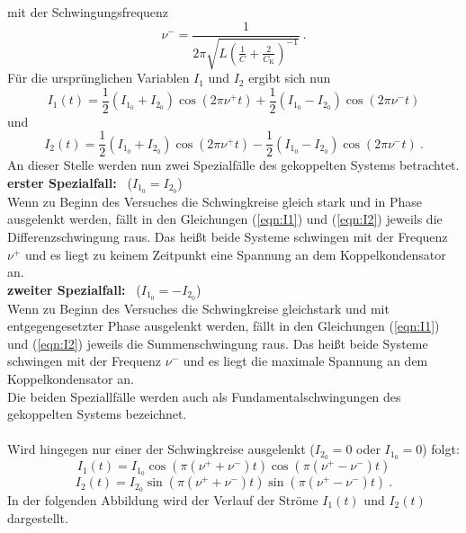 mit der Schwingungsfrequenz
\begin{equation}
\nu^- = \frac{1}{2 \pi \sqrt{L \left(\frac{1}{C} + \frac{2}{C_\text{K}} \right)^{-1}}} \ .
	\label{eqn:vm}
\end{equation}
Für die ursprünglichen Variablen $I_1$ und $I_2$ ergibt sich nun
\begin{equation}
	I_1(t) = \frac{1}{2}(I_{1_0} + I_{2_0}) \cos(2 \pi \nu^+ t) + \frac{1}{2}(I_{1_0} - I_{2_0}) \cos(2 \pi \nu^- t)
	\label{eqn:I1}
\end{equation}
und
\begin{equation}
	I_2(t) = \frac{1}{2}(I_{1_0} + I_{2_0}) \cos(2 \pi \nu^+ t) - \frac{1}{2}(I_{1_0} - I_{2_0}) \cos(2 \pi \nu^- t) \ .
	\label{eqn:I2}
\end{equation}
An dieser Stelle werden nun zwei Spezialfälle des gekoppelten Systems betrachtet. \\
\textbf{erster Spezialfall:} \ ($I_{1_0} = I_{2_0}$) \\
Wenn zu Beginn des Versuches die Schwingkreise gleich stark und in Phase ausgelenkt werden, fällt in den Gleichungen (\ref{eqn:I1}) und (\ref{eqn:I2}) jeweils die Differenzschwingung raus. Das heißt beide Systeme schwingen mit der Frequenz $\nu^+$ und es liegt zu keinem Zeitpunkt eine Spannung an dem Koppelkondensator an. \\
\textbf{zweiter Spezialfall:} \ ($I_{1_0} = -I_{2_0}$) \\
Wenn zu Beginn des Versuches die Schwingkreise gleichstark und mit entgegengesetzter Phase ausgelenkt werden, fällt in den Gleichungen (\ref{eqn:I1}) und (\ref{eqn:I2}) jeweils die Summenschwingung raus. Das heißt beide Systeme schwingen mit der Frequenz $\nu^-$ und es liegt die maximale Spannung an dem Koppelkondensator an. \\
Die beiden Speziallfälle werden auch als Fundamentalschwingungen des gekoppelten Systems bezeichnet.\\
\\
Wird hingegen nur einer der Schwingkreise ausgelenkt ($I_{2_0} = 0$ oder $I_{1_0} = 0$) folgt:
\begin{equation}
	I_1(t) = I_{1_0} \cos(\pi (\nu^+ + \nu^-)t) \cos(\pi (\nu^+ - \nu^-)t)
\end{equation}
\begin{equation}
	I_2(t) = I_{2_0} \sin(\pi (\nu^+ + \nu^-)t) \sin(\pi (\nu^+ - \nu^-)t) \ .
\end{equation}
In der folgenden Abbildung wird der Verlauf der Ströme $I_1(t)$ und $I_2(t)$ dargestellt.

